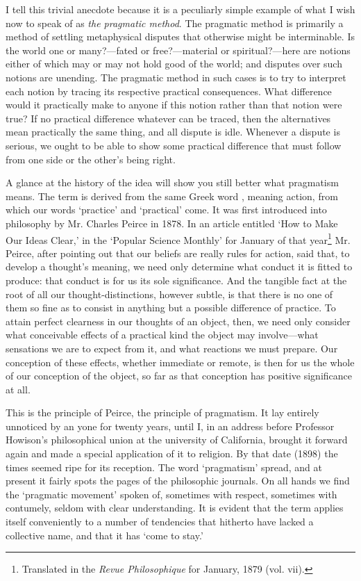 I tell this trivial anecdote because it is a peculiarly simple example
of what I wish now to speak of as \textit{the pragmatic method}. The
pragmatic method is primarily a method of settling metaphysical
disputes that otherwise might be interminable. Is the world one or
many?---fated or free?---material or spiritual?---here are notions
either of which may or may not hold good of the world; and disputes
over such notions are unending. The pragmatic method in such cases is
to try to interpret each notion by tracing its respective practical
consequences. What difference would it practically make to anyone if
this notion rather than that notion were true? If no practical
difference whatever can be traced, then the alternatives mean
practically the same thing, and all dispute is idle. Whenever a
dispute is serious, we ought to be  able to show some
practical difference that must follow from one side or the other's
being right.

A glance at the history of the idea will show you still better what
pragmatism means. The term is derived from the same Greek word
, meaning action, from which our words `practice' and
`practical' come. It was first introduced into philosophy by Mr.
Charles Peirce in 1878. In an article entitled `How to Make Our Ideas
Clear,' in the `Popular Science Monthly' for January of that
year\footnote{Translated in the \textit{Revue Philosophique} for
January, 1879 (vol. vii).} Mr. Peirce, after pointing out that our
beliefs are really rules for action, said that, to develop a thought's
meaning, we need only determine what conduct it is fitted to produce:
that conduct is for us its sole significance. And the tangible fact at
the root of all our thought-distinctions, however subtle, is that
there is no one of them so fine as to consist in anything but a
possible difference of practice. To attain perfect clearness in our
thoughts of an object, then, we need only consider what conceivable
 effects of a practical kind the object may in\-volve---what
sensations we are to expect from it, and what reactions we must
prepare. Our conception of these effects, whether immediate or remote,
is then for us the whole of our conception of the object, so far as
that conception has positive significance at all.

This is the principle of Peirce, the principle of pragmatism. It lay
entirely unnoticed by an yone for twenty years, until I, in an address
before Professor Howison's philosophical union at the university of
California, brought it forward again and made a special application of
it to religion. By that date (1898) the times seemed ripe for its
reception. The word `pragmatism' spread, and at present it fairly
spots the pages of the philosophic journals. On all hands we find the
`pragmatic movement' spoken of, sometimes with respect, sometimes with
contumely, seldom with clear understanding. It is evident that the
term applies itself conveniently to a number of tendencies that
hitherto have lacked a collective name, and that it has `come to
stay.'

